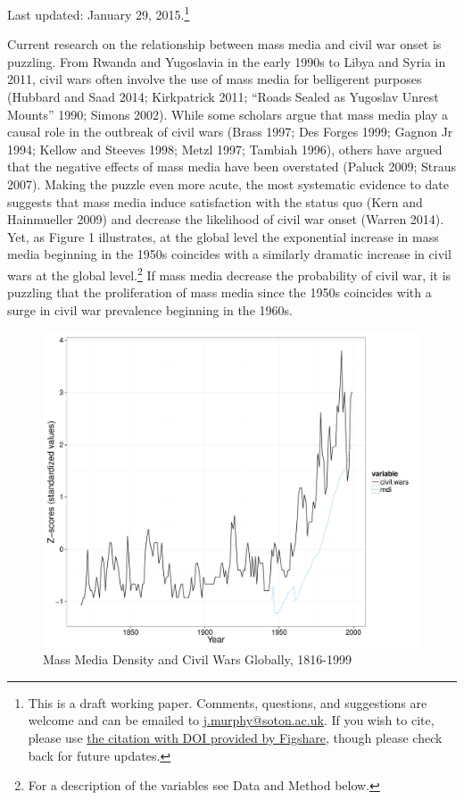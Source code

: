 \documentclass[11pt,article,oneside]{memoir}
\makeatletter
\def\maxwidth{\ifdim\Gin@nat@width>\linewidth\linewidth
\else\Gin@nat@width\fi}
\let\Oldincludegraphics\includegraphics
\renewcommand{\includegraphics}[1]{\Oldincludegraphics[width=\maxwidth]{#1}}
\makeatother
\begin{document}
Last updated: January 29, 2015.\footnote{This is a draft working paper.
  Comments, questions, and suggestions are welcome and can be emailed to
  \href{mailto:j.murphy@soton.ac.uk}{j.murphy@soton.ac.uk}. If you wish
  to cite, please use
  \href{http://figshare.com/authors/Justin_Murphy/498998}{the citation
  with DOI provided by Figshare}, though please check back for future
  updates.} \newline

\clearpage
{}

\onehalfspacing

Current research on the relationship between mass media and civil war
onset is puzzling. From Rwanda and Yugoslavia in the early 1990s to
Libya and Syria in 2011, civil wars often involve the use of mass media
for belligerent purposes (Hubbard and Saad 2014; Kirkpatrick 2011;
``Roads Sealed as Yugoslav Unrest Mounts'' 1990; Simons 2002). While
some scholars argue that mass media play a causal role in the outbreak
of civil wars (Brass 1997; Des Forges 1999; Gagnon Jr 1994; Kellow and
Steeves 1998; Metzl 1997; Tambiah 1996), others have argued that the
negative effects of mass media have been overstated (Paluck 2009; Straus
2007). Making the puzzle even more acute, the most systematic evidence
to date suggests that mass media induce satisfaction with the status quo
(Kern and Hainmueller 2009) and decrease the likelihood of civil war
onset (Warren 2014). Yet, as Figure 1 illustrates, at the global level
the exponential increase in mass media beginning in the 1950s coincides
with a similarly dramatic increase in civil wars at the global
level.\footnote{For a description of the variables see Data and Method
  below.} If mass media decrease the probability of civil war, it is
puzzling that the proliferation of mass media since the 1950s coincides
with a surge in civil war prevalence beginning in the 1960s.

\begin{figure}[htbp]
\centering
\includegraphics{media_civil_war_files/figure-markdown/globalplot.pdf}
\caption{Mass Media Density and Civil Wars Globally, 1816-1999}
\end{figure}
\end{document}

